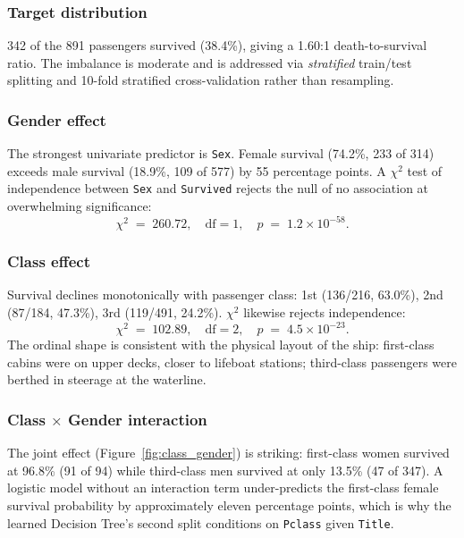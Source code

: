 \documentclass[10pt,a4paper,twocolumn]{article}
\begin{document}
\subsubsection{Target distribution}
342 of the 891 passengers survived (38.4\%), giving a 1.60:1 death-to-survival ratio.
The imbalance is moderate and is addressed via \emph{stratified} train/test splitting
and 10-fold stratified cross-validation rather than resampling.

\subsubsection{Gender effect}
The strongest univariate predictor is \texttt{Sex}. Female survival (74.2\%, 233 of
314) exceeds male survival (18.9\%, 109 of 577) by 55 percentage points. A
$\chi^2$ test of independence between \texttt{Sex} and \texttt{Survived} rejects
the null of no association at overwhelming significance:
\[
\chi^2 \;=\; 260.72,\quad \text{df} = 1,\quad p \;=\; 1.2\times 10^{-58}.
\]

\subsubsection{Class effect}
Survival declines monotonically with passenger class: 1st (136/216, 63.0\%),
2nd (87/184, 47.3\%), 3rd (119/491, 24.2\%). $\chi^2$ likewise rejects independence:
\[
\chi^2 \;=\; 102.89,\quad \text{df} = 2,\quad p \;=\; 4.5\times 10^{-23}.
\]
The ordinal shape is consistent with the physical layout of the ship: first-class
cabins were on upper decks, closer to lifeboat stations; third-class passengers were
berthed in steerage at the waterline.

\subsubsection{Class $\times$ Gender interaction}
The joint effect (Figure~\ref{fig:class_gender}) is striking: first-class women
survived at 96.8\% (91 of 94) while third-class men survived at only 13.5\% (47 of
347). A logistic model without an interaction term under-predicts the first-class
female survival probability by approximately eleven percentage points, which is why
the learned Decision Tree's second split conditions on \texttt{Pclass} given
\texttt{Title}.
\end{document}
